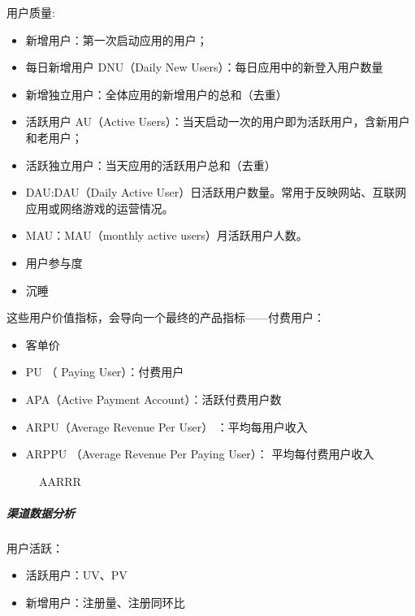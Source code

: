 \documentclass[letterpaper,11pt,english]{sphinxmanual}
\begin{document}
用户质量:
\begin{itemize}
\item {} 
新增用户：第一次启动应用的用户；

\item {} 
每日新增用户 DNU（Daily New Users）：每日应用中的新登入用户数量

\item {} 
新增独立用户：全体应用的新增用户的总和（去重）

\item {} 
活跃用户 AU（Active
Users）：当天启动一次的用户即为活跃用户，含新用户和老用户；

\item {} 
活跃独立用户：当天应用的活跃用户总和（去重）

\item {} 
DAU:DAU（Daily Active
User）日活跃用户数量。常用于反映网站、互联网应用或网络游戏的运营情况。

\item {} 
MAU：MAU（monthly active users）月活跃用户人数。

\item {} 
用户参与度

\item {} 
沉睡

\end{itemize}

这些用户价值指标，会导向一个最终的产品指标——付费用户：
\begin{itemize}
\item {} 
客单价

\item {} 
PU （ Paying User）：付费用户

\item {} 
APA（Active Payment Account）：活跃付费用户数

\item {} 
ARPU（Average Revenue Per User） ：平均每用户收入

\item {} 
ARPPU （Average Revenue Per Paying User）： 平均每付费用户收入

\end{itemize}

\begin{figure}[H]
\centering
\capstart

\noindent{}
\caption{AARRR}\label{\detokenize{chapter_skill/data_analysis:id13}}\end{figure}


\subparagraph{渠道数据分析}
\label{\detokenize{chapter_skill/data_analysis:id5}}
用户活跃：
\begin{itemize}
\item {} 
活跃用户：UV、PV

\item {} 
新增用户：注册量、注册同环比

\end{itemize}
\end{document}

